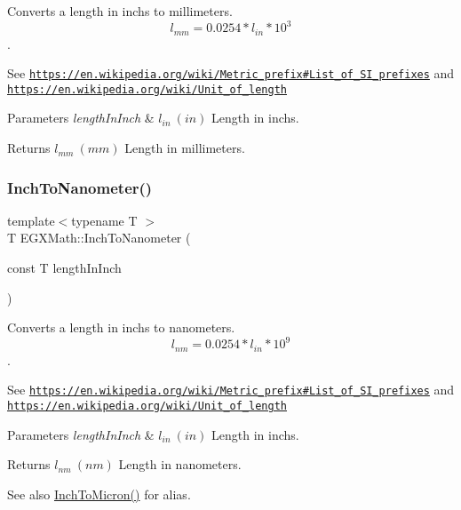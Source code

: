 Converts a length in inchs to millimeters. \[ l_{mm}=0.0254 * l_{in} * 10^{3} \]. 

See \href{https://en.wikipedia.org/wiki/Metric_prefix#List_of_SI_prefixes}{\tt https\+://en.\+wikipedia.\+org/wiki/\+Metric\+\_\+prefix\#\+List\+\_\+of\+\_\+\+S\+I\+\_\+prefixes} and \href{https://en.wikipedia.org/wiki/Unit_of_length}{\tt https\+://en.\+wikipedia.\+org/wiki/\+Unit\+\_\+of\+\_\+length} 
\begin{DoxyParams}{Parameters}
{\em length\+In\+Inch} & $ l_{in}\ (in)$ Length in inchs. \\
\hline
\end{DoxyParams}
\begin{DoxyReturn}{Returns}
$ l_{mm}\ (mm)$ Length in millimeters. 
\end{DoxyReturn}
\mbox{\label{group___e_g_x_math-_conversions-_length_conversions-_imperial-_inch-_s_i_gac4c0a73502ca20ec1a44748725c333ad}} 
\subsubsection{\texorpdfstring{Inch\+To\+Nanometer()}{InchToNanometer()}}
{\footnotesize\ttfamily template$<$typename T $>$ \\
T E\+G\+X\+Math\+::\+Inch\+To\+Nanometer (\begin{DoxyParamCaption}\item[{const T}]{length\+In\+Inch }\end{DoxyParamCaption})}



Converts a length in inchs to nanometers. \[ l_{nm}=0.0254 * l_{in} * 10^{9} \]. 

See \href{https://en.wikipedia.org/wiki/Metric_prefix#List_of_SI_prefixes}{\tt https\+://en.\+wikipedia.\+org/wiki/\+Metric\+\_\+prefix\#\+List\+\_\+of\+\_\+\+S\+I\+\_\+prefixes} and \href{https://en.wikipedia.org/wiki/Unit_of_length}{\tt https\+://en.\+wikipedia.\+org/wiki/\+Unit\+\_\+of\+\_\+length} 
\begin{DoxyParams}{Parameters}
{\em length\+In\+Inch} & $ l_{in}\ (in)$ Length in inchs. \\
\hline
\end{DoxyParams}
\begin{DoxyReturn}{Returns}
$ l_{nm}\ (nm)$ Length in nanometers. 
\end{DoxyReturn}
\begin{DoxySeeAlso}{See also}
\mbox{\hyperlink{group___e_g_x_math-_conversions-_length_conversions-_imperial-_inch-_non-_s_i_ga28d3076041cdf54ce5c25f834fb16128}{Inch\+To\+Micron()}} for alias. 
\end{DoxySeeAlso}
\mbox{\label{group___e_g_x_math-_conversions-_length_conversions-_imperial-_inch-_s_i_gae30ce4093b17aa63cc6d96a035e8dc61}} 
